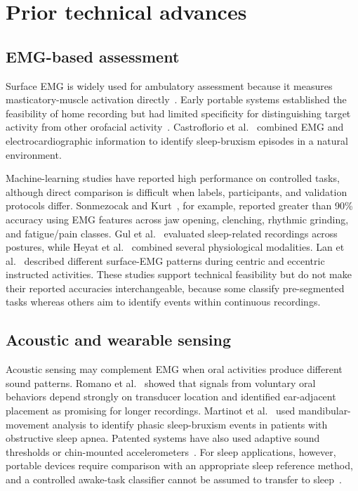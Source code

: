 \documentclass[pdflatex,sn-nature,iicol]{sn-jnl}
\begin{document}
\section{Prior technical advances}

\subsection{EMG-based assessment}

Surface EMG is widely used for ambulatory assessment because it measures masticatory-muscle activation directly~\cite{raez2006techniques}. Early portable systems established the feasibility of home recording but had limited specificity for distinguishing target activity from other orofacial activity~\cite{stuginski2016detection}. Castroflorio et al.~\cite{castroflorio2013use} combined EMG and electrocardiographic information to identify sleep-bruxism episodes in a natural environment.

Machine-learning studies have reported high performance on controlled tasks, although direct comparison is difficult when labels, participants, and validation protocols differ. Sonmezocak and Kurt~\cite{sonmezocak2021detection}, for example, reported greater than 90\% accuracy using EMG features across jaw opening, clenching, rhythmic grinding, and fatigue/pain classes. Gul et al.~\cite{gul2024advanced} evaluated sleep-related recordings across postures, while Heyat et al.~\cite{heyat2020computational} combined several physiological modalities. Lan et al.~\cite{lan2022comparative} described different surface-EMG patterns during centric and eccentric instructed activities. These studies support technical feasibility but do not make their reported accuracies interchangeable, because some classify pre-segmented tasks whereas others aim to identify events within continuous recordings.

\subsection{Acoustic and wearable sensing}

Acoustic sensing may complement EMG when oral activities produce different sound patterns. Romano et al.~\cite{romano2024wearable} showed that signals from voluntary oral behaviors depend strongly on transducer location and identified ear-adjacent placement as promising for longer recordings. Martinot et al.~\cite{martinot2021artificial} used mandibular-movement analysis to identify phasic sleep-bruxism events in patients with obstructive sleep apnea. Patented systems have also used adaptive sound thresholds or chin-mounted accelerometers~\cite{haugland2020automatic,patwa2017bruxism}. For sleep applications, however, portable devices require comparison with an appropriate sleep reference method, and a controlled awake-task classifier cannot be assumed to transfer to sleep~\cite{cidverdejo2024instrumental}.
\end{document}
